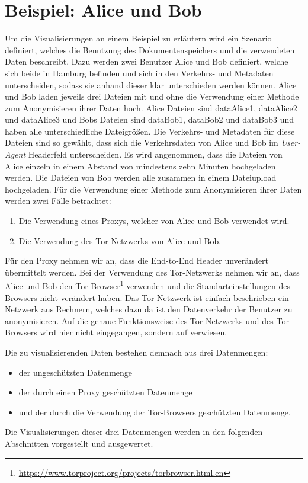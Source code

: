 \documentclass[
    fontsize=12pt,
    headings=small,
    parskip=half,           %
    bibliography=totoc,
    numbers=noenddot,       %
    open=any,               %
    ]{scrreprt}
\begin{document}
    \section{Beispiel: Alice und Bob} \label{AliceBob}
Um die Visualisierungen an einem Beispiel zu erläutern wird ein Szenario definiert, welches die Benutzung des Dokumentenspeichers und die verwendeten Daten beschreibt.
Dazu werden zwei Benutzer Alice und Bob definiert, welche sich beide in Hamburg befinden und sich in den Verkehrs- und Metadaten unterscheiden, sodass sie anhand dieser klar unterschieden werden können.
Alice und Bob laden jeweils drei Dateien mit und ohne die Verwendung einer Methode zum Anonymisieren ihrer Daten hoch.
Alice Dateien sind dataAlice1, dataAlice2 und dataAlice3 und Bobs Dateien sind dataBob1, dataBob2 und dataBob3 und haben alle unterschiedliche Dateigrößen.
Die Verkehrs- und Metadaten für diese Dateien sind so gewählt, dass sich die Verkehrsdaten von Alice und Bob im \textit{User-Agent} Headerfeld unterscheiden.
Es wird angenommen, dass die Dateien von Alice einzeln in einem Abstand von mindestens zehn Minuten hochgeladen werden.
Die Dateien von Bob werden alle zusammen in einem Dateiupload hochgeladen.
Für die Verwendung einer Methode zum Anonymisieren ihrer Daten werden zwei Fälle betrachtet:
\begin{enumerate}
\item Die Verwendung eines Proxys, welcher von Alice und Bob verwendet wird.
\item Die Verwendung des Tor-Netzwerks von Alice und Bob.
\end{enumerate}
Für den Proxy nehmen wir an, dass die End-to-End Header \cite[sec. 13.5.1]{HTTP} unverändert übermittelt werden.
Bei der Verwendung des Tor-Netzwerks nehmen wir an, dass Alice und Bob den Tor-Browser\footnote{\url{https://www.torproject.org/projects/torbrowser.html.en}} verwenden und die Standarteinstellungen des Browsers nicht verändert haben.
Das Tor-Netzwerk ist einfach beschrieben ein Netzwerk aus Rechnern, welches dazu da ist den Datenverkehr der Benutzer zu anonymisieren.
Auf die genaue Funktionsweise des Tor-Netzwerks und des Tor-Browsers wird hier nicht eingegangen, sondern auf \cite{Tor} verwiesen.

Die zu visualisierenden Daten bestehen demnach aus drei Datenmengen:
\begin{itemize}
\item der ungeschützten Datenmenge
\item der durch einen Proxy geschützten Datenmenge
\item und der durch die Verwendung der Tor-Browsers geschützten Datenmenge.
\end{itemize}
Die Visualisierungen dieser drei Datenmengen werden in den folgenden Abschnitten vorgestellt und ausgewertet.
\end{document}
